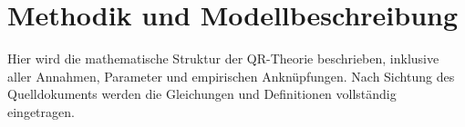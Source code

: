 \section{Methodik und Modellbeschreibung}
Hier wird die mathematische Struktur der QR-Theorie beschrieben, inklusive aller
Annahmen, Parameter und empirischen Ankn\"upfungen. Nach Sichtung des Quelldokuments
werden die Gleichungen und Definitionen vollst\"andig eingetragen.
